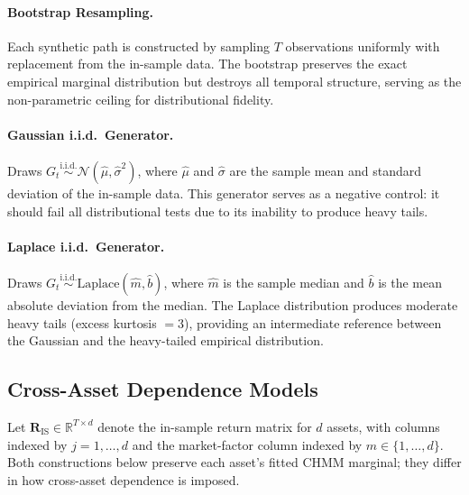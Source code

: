 \paragraph{Bootstrap Resampling.}
Each synthetic path is constructed by sampling $T$ observations uniformly with replacement from the in-sample data.
The bootstrap preserves the exact empirical marginal distribution but destroys all temporal structure, serving as the non-parametric ceiling for distributional fidelity.

\paragraph{Gaussian i.i.d.\ Generator.}
Draws $G_t \overset{\text{i.i.d.}}{\sim} \mathcal{N}(\hat{\mu}, \hat{\sigma}^2)$, where $\hat{\mu}$ and $\hat{\sigma}$ are the sample mean and standard deviation of the in-sample data.
This generator serves as a negative control: it should fail all distributional tests due to its inability to produce heavy tails.

\paragraph{Laplace i.i.d.\ Generator.}
Draws $G_t \overset{\text{i.i.d.}}{\sim} \text{Laplace}(\hat{m}, \hat{b})$, where $\hat{m}$ is the sample median and $\hat{b}$ is the mean absolute deviation from the median.
The Laplace distribution produces moderate heavy tails (excess kurtosis $= 3$), providing an intermediate reference between the Gaussian and the heavy-tailed empirical distribution.

\subsection{Cross-Asset Dependence Models}
\label{sec:cross_asset_methods}

Let $\mathbf{R}_{\text{IS}} \in \mathbb{R}^{T \times d}$ denote the in-sample return matrix for $d$ assets, with columns indexed by $j = 1, \ldots, d$ and the market-factor column indexed by $m \in \{1, \ldots, d\}$.
Both constructions below preserve each asset's fitted CHMM marginal; they differ in how cross-asset dependence is imposed.

